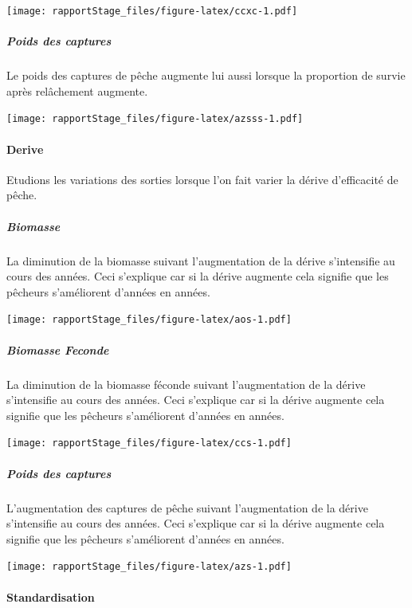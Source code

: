 \documentclass[
]{article}
\begin{document}
\texttt{[image: rapportStage\_files/figure-latex/ccxc-1.pdf]}

\hypertarget{poids-des-captures}{%
\subparagraph{Poids des captures}\label{poids-des-captures}}

Le poids des captures de pêche augmente lui aussi lorsque la proportion
de survie après relâchement augmente.

\texttt{[image: rapportStage\_files/figure-latex/azsss-1.pdf]}

\hypertarget{derive}{%
\paragraph{Derive}\label{derive}}

Etudions les variations des sorties lorsque l'on fait varier la dérive
d'efficacité de pêche.

\hypertarget{biomasse-2}{%
\subparagraph{Biomasse}\label{biomasse-2}}

La diminution de la biomasse suivant l'augmentation de la dérive
s'intensifie au cours des années. Ceci s'explique car si la dérive
augmente cela signifie que les pêcheurs s'améliorent d'années en années.

\texttt{[image: rapportStage\_files/figure-latex/aos-1.pdf]}

\hypertarget{biomasse-feconde-1}{%
\subparagraph{Biomasse Feconde}\label{biomasse-feconde-1}}

La diminution de la biomasse féconde suivant l'augmentation de la dérive
s'intensifie au cours des années. Ceci s'explique car si la dérive
augmente cela signifie que les pêcheurs s'améliorent d'années en années.

\texttt{[image: rapportStage\_files/figure-latex/ccs-1.pdf]}

\hypertarget{poids-des-captures-1}{%
\subparagraph{Poids des captures}\label{poids-des-captures-1}}

L'augmentation des captures de pêche suivant l'augmentation de la dérive
s'intensifie au cours des années. Ceci s'explique car si la dérive
augmente cela signifie que les pêcheurs s'améliorent d'années en années.

\texttt{[image: rapportStage\_files/figure-latex/azs-1.pdf]}

\hypertarget{standardisation}{%
\paragraph{Standardisation}\label{standardisation}}
\end{document}
